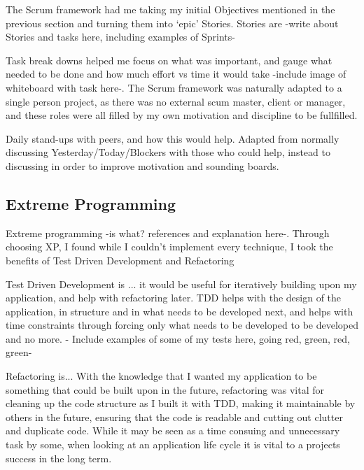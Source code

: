 The Scrum framework had me taking my initial Objectives mentioned in the previous section and turning them into `epic' Stories. Stories are -write about Stories and tasks here, including examples of Sprints-

Task break downs helped me focus on what was important, and gauge what needed to be done and how much effort vs time it would take -include image of whiteboard with task here-. The Scrum framework was naturally adapted to a single person project, as there was no external scum master, client or manager, and these roles were all filled by my own motivation and discipline to be fullfilled.

Daily stand-ups with peers, and how this would help. Adapted from normally discussing Yesterday/Today/Blockers with those who could help, instead to discussing in order to improve motivation and sounding boards.

\subsection{Extreme Programming}
Extreme programming -is what? references and explanation here-. Through choosing XP, I found while I couldn't implement every technique, I took the benefits of Test Driven Development and Refactoring

Test Driven Development is ... it would be useful for iteratively building upon my application, and help with refactoring later. TDD helps with the design of the application, in structure and in what needs to be developed next, and helps with time constraints through forcing only what needs to be developed to be developed and no more. - Include examples of some of my tests here, going red, green, red, green-

Refactoring is... With the knowledge that I wanted my application to be something that could be built upon in the future, refactoring was vital for cleaning up the code structure as I built it with TDD, making it maintainable by others in the future, ensuring that the code is readable and cutting out clutter and duplicate code. While it may be seen as a time consuing and unnecessary task by some, when looking at an application life cycle it is vital to a projects success in the long term.

